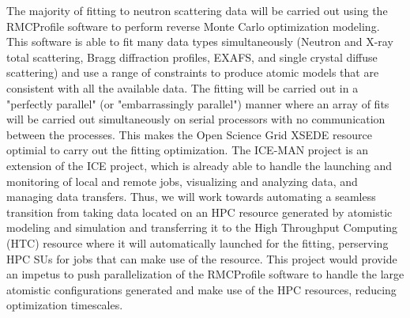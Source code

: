 The majority of fitting to neutron scattering data will be carried out using the RMCProfile software to perform reverse Monte Carlo optimization modeling. This software is able to fit many data types simultaneously (Neutron and X-ray total scattering, Bragg diffraction profiles, EXAFS, and single crystal diffuse scattering) and use a range of constraints to produce atomic models that are consistent with all the available data. The fitting will be carried out in a "perfectly parallel" (or "embarrassingly parallel") manner where an array of fits will be carried out simultaneously on serial processors with no communication between the processes. This makes the Open Science Grid XSEDE resource optimial to carry out the fitting optimization. The ICE-MAN project is an extension of the ICE project, which is already able to handle the launching and monitoring of local and remote jobs, visualizing and analyzing data, and managing data transfers. Thus, we will work towards automating a seamless transition from taking data located on an HPC resource generated by atomistic modeling and simulation and transferring it to the High Throughput Computing (HTC) resource where it will automatically launched for the fitting, perserving HPC SUs for jobs that can make use of the resource. This project would provide an impetus to push parallelization of the RMCProfile software to handle the large atomistic configurations generated and make use of the HPC resources, reducing optimization timescales.

